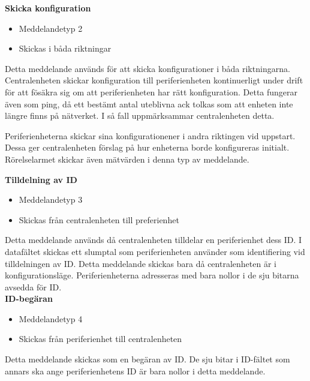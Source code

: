 \textbf{Skicka konfiguration}
\begin{itemize}
    \item Meddelandetyp 2
    \item Skickas i båda riktningar
\end{itemize}
Detta meddelande används för att skicka konfigurationer i båda riktningarna.
Centralenheten skickar konfiguration till periferienheten kontinuerligt under drift för att fösäkra sig om att periferienheten har rätt konfiguration. Detta fungerar även som ping, då ett bestämt antal uteblivna ack tolkas som att enheten inte längre finns på nätverket.
I så fall uppmärksammar centralenheten detta.

Periferienheterna skickar sina konfigurationener i andra riktingen vid uppstart.
Dessa ger centralenheten förslag på hur enheterna borde konfigureras initialt. Rörelselarmet skickar även mätvärden i denna typ av meddelande.


\textbf{Tilldelning av ID}
\begin{itemize}
    \item Meddelandetyp 3
    \item Skickas från centralenheten till preferienhet
\end{itemize}
Detta meddelande används då centralenheten tilldelar en periferienhet dess ID. I datafältet skickas ett slumptal som periferienheten använder som identifiering vid tilldelningen av ID. Detta meddelande skickas bara då centralenheten är i konfigurationsläge. Periferienheterna adresseras med bara nollor i de sju bitarna avsedda för ID. \\


\textbf{ID-begäran}
\begin{itemize}
    \item Meddelandetyp 4
    \item Skickas från periferienhet till centralenheten
\end{itemize}
Detta meddelande skickas som en begäran av ID. De sju bitar i ID-fältet som annars ska ange periferienhetens ID är bara nollor i detta meddelande.
